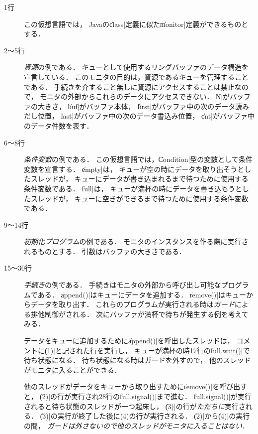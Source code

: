 

\begin{description}
\item [1行] この仮想言語では，
  Javaの\|class|定義に似た\|monitor|定義ができるものとする．
\item [2〜5行] \emph{資源}の例である．
  キューとして使用するリングバッファのデータ構造を宣言している．
  このモニタの目的は，資源であるキューを管理することである．
  手続きを介すること無しに資源にアクセスすることは禁止なので，
  モニタの外部からこれらのデータにアクセスできない．
  \|N|がバッファの大きさ，
  \|buf|がバッファ本体，
  \|first|がバッファ中の次のデータ読みだし位置，
  \|last|がバッファ中の次のデータ書込み位置，
  \|cnt|がバッファ中のデータ件数を表す．
\item [6〜8行] \emph{条件変数}の例である．
  この仮想言語では，\|Condition|型の変数として条件変数を宣言する．
  \|empty|は，
  キューが空の時にデータを取り出そうとしたスレッドが，
  キューにデータが書き込まれるまで待つために使用する条件変数である．
  \|full|は，
  キューが満杯の時にデータを書き込もうとしたスレッドが，
  キューに空きができるまで待つために使用する条件変数である．
\item [9〜14行] \emph{初期化プログラム}の例である．
  モニタのインスタンスを作る際に実行されるものとする．
  引数はバッファの大きさである．
\item [15〜30行] \emph{手続き}の例である．
  手続きはモニタの外部から呼び出し可能なプログラムである．
  \|append()|はキューにデータを追加する．
  \|remove()|はキューからデータを取り出す．
  これらのプログラムが実行される時は\emph{ガード}による排他制御がされる．
  次にバッファが満杯で待ちが発生する例を考えてみる．

  データをキューに追加するために\|append()|を呼出したスレッドは，
  コメントに\|(1)|と記された行を実行し，
  キューが満杯の時17行の\|full.wait()|で待ち状態になる．
  待ち状態になる時はガードを外すので，
  他のスレッドがモニタに入ることができる．

  他のスレッドがデータをキューから取り出すために\|remove()|を呼び出すと，
  \|(2)|の行が実行され28行の\|full.signal()|まで進む．
  \|full.signal()|が実行されると待ち状態のスレッドが一つ起床し，
  \|(3)|の行が\emph{ただちに}実行される．
  \|(3)|の実行が終了した後に(4)の行が実行される．
  \|(2)|から\|(4)|の実行の間，
  \emph{ガードは外さないので他のスレッドがモニタに入ることはない．}
\end{description}

